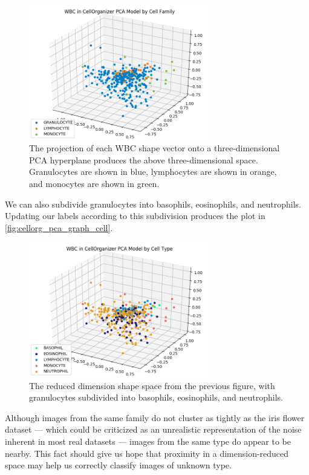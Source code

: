 \begin{figure}[h]
\centering
\mySfFamily
\includegraphics[width = 0.7\textwidth]{../images/cellorg_pca_graph.png}
\caption{The projection of each WBC shape vector onto a three-dimensional PCA hyperplane produces the above three-dimensional space. Granulocytes are shown in blue, lymphocytes are shown in orange, and monocytes are shown in green.}
\label{fig:cellorg_pca_graph}
\end{figure}

We can also subdivide granulocytes into basophils, eosinophils, and neutrophils. Updating our labels according to this subdivision produces the plot in \autoref{fig:cellorg_pca_graph_cell}.

\begin{figure}[h]
\centering
\mySfFamily
\includegraphics[width = 0.7\textwidth]{../images/cellorg_pca_graph_cell.png}
\caption{The reduced dimension shape space from the previous figure, with granulocytes subdivided into basophils, eosinophils, and neutrophils.}
\label{fig:cellorg_pca_graph_cell}
\end{figure}

Although images from the same family do not cluster as tightly as the iris flower dataset --- which could be criticized as an unrealistic representation of the noise inherent in most real datasets --- images from the same type do appear to be nearby. This fact should give us hope that proximity in a dimension-reduced space may help us correctly classify images of unknown type.

